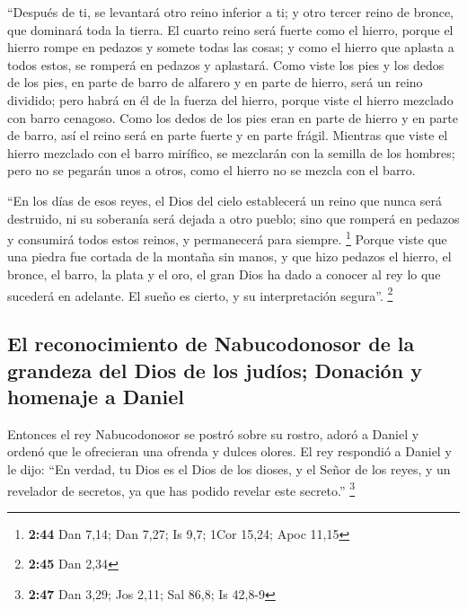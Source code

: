\begin{paracol}{2}
 ``Después de ti, se levantará otro reino inferior a ti;
y otro tercer reino de bronce, que dominará toda la tierra.
 El cuarto reino será fuerte como el hierro, porque el
hierro rompe en pedazos y somete todas las cosas; y como el hierro que
aplasta a todos estos, se romperá en pedazos y aplastará.
 Como viste los pies y los dedos de los pies, en parte de
barro de alfarero y en parte de hierro, será un reino dividido; pero
habrá en él de la fuerza del hierro, porque viste el hierro mezclado con
barro cenagoso.  Como los dedos de los pies eran en parte
de hierro y en parte de barro, así el reino será en parte fuerte y en
parte frágil.  Mientras que viste el hierro mezclado con
el barro mirífico, se mezclarán con la semilla de los hombres; pero no
se pegarán unos a otros, como el hierro no se mezcla con el barro.

 ``En los días de esos reyes, el Dios del cielo
establecerá un reino que nunca será destruido, ni su soberanía será
dejada a otro pueblo; sino que romperá en pedazos y consumirá todos
estos reinos, y permanecerá para siempre. \footnote{\textbf{2:44} Dan
  7,14; Dan 7,27; Is 9,7; 1Cor 15,24; Apoc 11,15}  Porque
viste que una piedra fue cortada de la montaña sin manos, y que hizo
pedazos el hierro, el bronce, el barro, la plata y el oro, el gran Dios
ha dado a conocer al rey lo que sucederá en adelante. El sueño es
cierto, y su interpretación segura''. \footnote{\textbf{2:45} Dan 2,34}

\hypertarget{el-reconocimiento-de-nabucodonosor-de-la-grandeza-del-dios-de-los-juduxedos-donaciuxf3n-y-homenaje-a-daniel}{%
\subsection{El reconocimiento de Nabucodonosor de la grandeza del Dios
de los judíos; Donación y homenaje a
Daniel}\label{el-reconocimiento-de-nabucodonosor-de-la-grandeza-del-dios-de-los-juduxedos-donaciuxf3n-y-homenaje-a-daniel}}

 Entonces el rey Nabucodonosor se postró sobre su rostro,
adoró a Daniel y ordenó que le ofrecieran una ofrenda y dulces olores.
 El rey respondió a Daniel y le dijo: ``En verdad, tu
Dios es el Dios de los dioses, y el Señor de los reyes, y un revelador
de secretos, ya que has podido revelar este secreto.'' \footnote{\textbf{2:47}
  Dan 3,29; Jos 2,11; Sal 86,8; Is 42,8-9}


\end{paracol}
